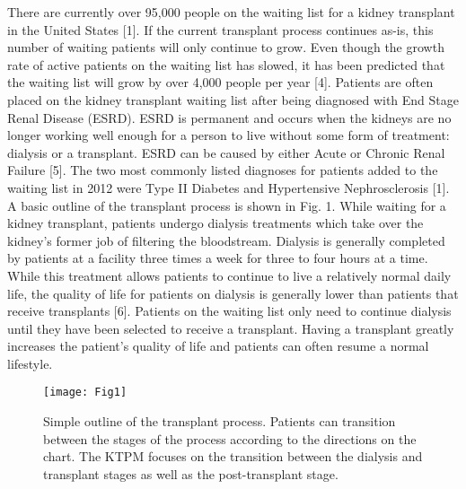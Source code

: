 \documentclass[9pt,a4paper,twocolumn]{scrartcl}
\begin{document}
There are currently over 95,000 people on the waiting list for a kidney transplant in the United States [1].  If the current transplant process continues as-is, this number of waiting patients will only continue to grow.  Even though the growth rate of active patients on the waiting list has slowed, it has been predicted that the waiting list will grow by over 4,000 people per year [4].
Patients are often placed on the kidney transplant waiting list after being diagnosed with End Stage Renal Disease (ESRD).  ESRD is permanent and occurs when the kidneys are no longer working well enough for a person to live without some form of treatment: dialysis or a transplant.  ESRD can be caused by either Acute or Chronic Renal Failure [5].  The two most commonly listed diagnoses for patients added to the waiting list in 2012 were Type II Diabetes and Hypertensive Nephrosclerosis [1].  A basic outline of the transplant process is shown in Fig. 1.
While waiting for a kidney transplant, patients undergo dialysis treatments which take over the kidney’s former job of filtering the bloodstream.  Dialysis is generally completed by patients at a facility three times a week for three to four hours at a time.  While this treatment allows patients to continue to live a relatively normal daily life, the quality of life for patients on dialysis is generally lower than patients that receive transplants [6].
Patients on the waiting list only need to continue dialysis until they have been selected to receive a transplant.  Having a transplant greatly increases the patient’s quality of life and patients can often resume a normal lifestyle.

\begin{figure}[h!]
  \caption{Simple outline of the transplant process.  Patients can transition between the stages of the process according to the directions on the chart.  The KTPM focuses on the transition between the dialysis and transplant stages as well as the post-transplant stage.}
  \centering
    \texttt{[image: Fig1]}
\end{figure}
\end{document}
